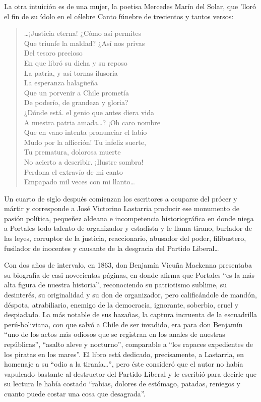 \documentclass[10pt,twoside,openright]{memoir}
\begin{document}
La otra intuición es de una mujer, la poetisa Mercedes Marín del Solar,
que 'lloró el fin de su ídolo en el célebre Canto fúnebre de trecientos
y tantos versos:

\begin{verse}
\ldots¡Justicia eterna! ¿Cómo así permites\\
Que triunfe la maldad? ¿Así nos privas\\
Del tesoro precioso\\
En que libró su dicha y su reposo\\
La patria, y así tornas ilusoria\\
La esperanza halagüeña\\
Que un porvenir a Chile prometía\\
De poderío, de grandeza y gloria?\\
¿Dónde está. el genio que antes diera vida\\
A nuestra patria amada\ldots? ¡Oh caro nombre\\
Que en vano intenta pronunciar el labio\\
Mudo por la aflicción! Tu infeliz suerte,\\
Tu prematura, dolorosa muerte\\
No acierto a describir. ¡Ilustre sombra!\\
Perdona el extravío de mi canto\\
Empapado mil veces con mi llanto\ldots
\end{verse}

Un cuarto de siglo después comienzan los escritores a ocuparse del
prócer y mártir y corresponde a José Victorino Lastarria producir ese
monumento de pasión política, pequeñez aldeana e incompetencia
historiográfica en donde niega a Portales todo talento de organizador y
estadista y le llama tirano, burlador de las leyes, corruptor de la
justicia, reaccionario, abusador del poder, filibustero, fusilador de
inocentes y causante de la desgracia del Partido Liberal\ldots

Con dos años de intervalo, en 1863, don Benjamín Vicuña Mackenna
presentaba su biografía de casi novecientas páginas, en donde afirma que
Portales ``es la más alta figura de nuestra historia'', reconociendo su
patriotismo sublime, su desinterés, su originalidad y su don de
organizador, pero calificándole de mandón, déspota, atrabiliario,
enemigo de la democracia, ignorante, soberbio, cruel y despiadado. La
más notable de sus hazañas, la captura incruenta de la escuadrilla
perú-boliviana, con que salvó a Chile de ser invadido, era para don
Benjamín ``uno de los actos más odiosos que se registran en los anales de
nuestras repúblicas'', ``asalto aleve y nocturno'', comparable a ``los
rapaces expedientes de los piratas en los mares''. El libro está
dedicado, precisamente, a Lastarria, en homenaje a su ``odio a la
tiranía\ldots'', pero éste consideró que el autor no había vapuleado
bastante al destructor del Partido Liberal y le escribió para decirle
que su lectura le había costado ``rabias, dolores de estómago, patadas,
reniegos y cuanto puede costar una cosa que desagrada''.
\end{document}
